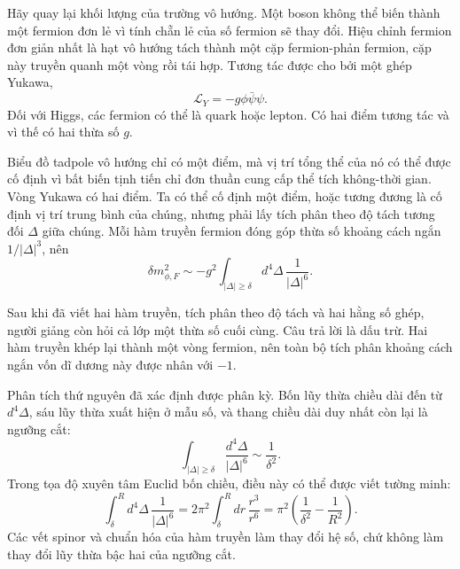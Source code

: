 Hãy quay lại khối lượng của trường vô hướng. Một boson không thể biến thành một fermion đơn lẻ vì tính chẵn lẻ của số fermion sẽ thay đổi. Hiệu chỉnh fermion đơn giản nhất là hạt vô hướng tách thành một cặp fermion-phản fermion, cặp này truyền quanh một vòng rồi tái hợp. Tương tác được cho bởi một ghép Yukawa,
\begin{equation}
\mathcal L_Y=-g\phi\bar\psi\psi.
\end{equation}
Đối với Higgs, các fermion có thể là quark hoặc lepton. Có hai điểm tương tác và vì thế có hai thừa số \(g\).

Biểu đồ tadpole vô hướng chỉ có một điểm, mà vị trí tổng thể của nó có thể được cố định vì bất biến tịnh tiến chỉ đơn thuần cung cấp thể tích không-thời gian. Vòng Yukawa có hai điểm. Ta có thể cố định một điểm, hoặc tương đương là cố định vị trí trung bình của chúng, nhưng phải lấy tích phân theo độ tách tương đối \(\Delta\) giữa chúng. Mỗi hàm truyền fermion đóng góp thừa số khoảng cách ngắn \(1/|\Delta|^3\), nên
\begin{equation}
\delta m_{\phi,F}^2
\sim
-g^2\int_{|\Delta|\geq\delta}d^4\Delta\,
\frac{1}{|\Delta|^6}.
\end{equation}

Sau khi đã viết hai hàm truyền, tích phân theo độ tách và hai hằng số ghép, người giảng còn hỏi cả lớp một thừa số cuối cùng. Câu trả lời là dấu trừ. Hai hàm truyền khép lại thành một vòng fermion, nên toàn bộ tích phân khoảng cách ngắn vốn dĩ dương này được nhân với \(-1\).

Phân tích thứ nguyên đã xác định được phân kỳ. Bốn lũy thừa chiều dài đến từ \(d^4\Delta\), sáu lũy thừa xuất hiện ở mẫu số, và thang chiều dài duy nhất còn lại là ngưỡng cắt:
\begin{equation}
\int_{|\Delta|\geq\delta}
\frac{d^4\Delta}{|\Delta|^6}
\sim\frac{1}{\delta^2}.
\end{equation}
Trong tọa độ xuyên tâm Euclid bốn chiều, điều này có thể được viết tường minh:
\begin{equation}
\int_{\delta}^{R}d^4\Delta\,\frac{1}{|\Delta|^6}
=2\pi^2\int_{\delta}^{R}dr\,\frac{r^3}{r^6}
=\pi^2\left(\frac{1}{\delta^2}-\frac{1}{R^2}\right).
\end{equation}
Các vết spinor và chuẩn hóa của hàm truyền làm thay đổi hệ số, chứ không làm thay đổi lũy thừa bậc hai của ngưỡng cắt.

